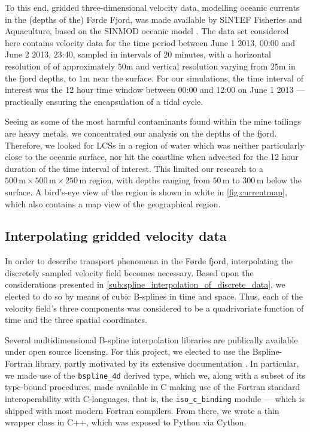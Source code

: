 To this end, gridded three-dimensional velocity data, modelling oceanic
currents in the (depths of the) Førde Fjord, was made available by SINTEF
Fisheries and Aquaculture, based on the SINMOD oceanic model
\parencite{slagstad2005modeling}. The data set considered here contains velocity
data for the time period between June 1 2013, 00:00 and June 2 2013, 23:40,
sampled in intervals of 20 minutes, with a horizontal resolution of
of approximately $50\si{\meter}$ and vertical resolution varying from
$25\si{\meter}$ in the fjord depths, to $1\si{\meter}$ near the surface. For our
simulations, the time interval of interest was the 12 hour time window between
00:00 and 12:00 on June 1 2013 --- practically ensuring the encapsulation of a
tidal cycle.

Seeing as some of the most harmful contaminants found within the mine tailings
are heavy metals, we concentrated our analysis on the depths of the fjord.
Therefore, we looked for LCSs in a region of water which was neither
particularly close to the oceanic surface, nor hit the coastline when
advected for the 12 hour duration of the time interval of interest. This
limited our research to a
$500\,\si{\meter}\times500\,\si{\meter}\times250\,\si{\meter}$ region, with
depths ranging from $50\,\si{\meter}$ to $300\,\si{\meter}$ below the
surface. A bird's-eye view of the region is shown in white in
\cref{fig:currentmap}, which also contains a map view of the geographical
region.



\subsection{Interpolating gridded velocity data}
\label{sub:interpolating_gridded_velocity_data}

In order to describe transport phenomena in the Førde fjord, interpolating
the discretely sampled velocity field becomes necessary. Based upon the
considerations presented in \cref{sub:spline_interpolation_of_discrete_data},
we elected to do so by means of cubic B-splines in time and space. Thus,
each of the velocity field's three components was considered to be a
quadrivariate function of time and the three spatial coordinates.

Several multidimensional B-spline interpolation libraries are publically
available under open source licensing. For this project, we elected to use
the Bspline-Fortran library, partly motivated by its extensive documentation
\parencite{williams2018bspline}. In particular, we made use of the
\texttt{bspline\_4d} derived type, which we, along with a subset of its
type-bound procedures, made available in C making use of the Fortran standard
interoperability with C-languages, that is, the \texttt{iso\_c\_binding} module
--- which is shipped with most modern Fortran compilers. From there, we wrote a
thin wrapper class in C++, which was exposed to Python via Cython.

